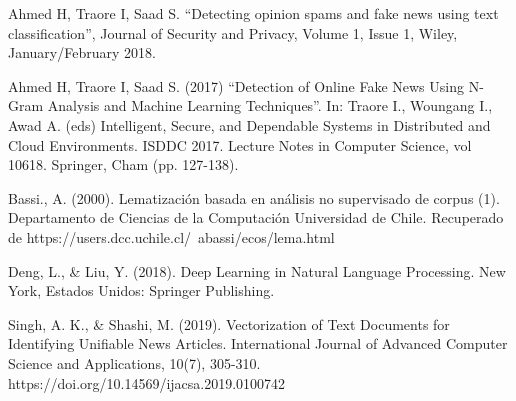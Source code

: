 \documentclass[conference]{IEEEtran}
\begin{document}
\begin{thebibliography}{00}
 Ahmed H, Traore I, Saad S. ``Detecting opinion spams and fake news using text classification'', Journal of Security and Privacy, Volume 1, Issue 1, Wiley, January/February 2018.

 Ahmed H, Traore I, Saad S. (2017) ``Detection of Online Fake News Using N-Gram Analysis and Machine Learning Techniques''. In: Traore I., Woungang I., Awad A. (eds) Intelligent, Secure, and Dependable Systems in Distributed and Cloud Environments. ISDDC 2017. Lecture Notes in Computer Science, vol 10618. Springer, Cham (pp. 127-138).

 Bassi., A. (2000). Lematización basada en análisis no supervisado de corpus (1). Departamento de Ciencias de la Computación Universidad de Chile. Recuperado de https://users.dcc.uchile.cl/~abassi/ecos/lema.html

 Deng, L., \& Liu, Y. (2018). Deep Learning in Natural Language Processing. New York, Estados Unidos: Springer Publishing.

 Singh, A. K., \& Shashi, M. (2019). Vectorization of Text Documents for Identifying Unifiable News Articles. International Journal of Advanced Computer Science and Applications, 10(7), 305-310. https://doi.org/10.14569/ijacsa.2019.0100742


\end{thebibliography}
\newpage

% 
\end{document}
